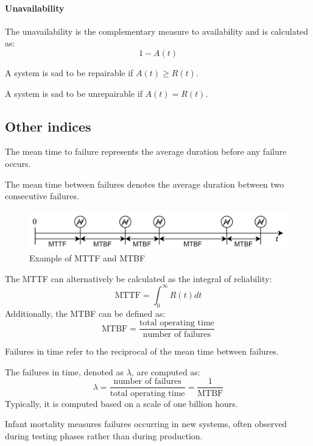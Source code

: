 \paragraph*{Unavailability}
The unavailability is the complementary measure to availability and is calculated as:
\[1-A(t)\]
\begin{definition}
    A system is sad to be repairable if $A(t) \geq R(t)$. 
\end{definition}
\begin{definition}
    A system is sad to be unrepairable if $A(t) = R(t)$. 
\end{definition}

\subsection{Other indices}
\begin{definition}
    The mean time to failure represents the average duration before any failure occurs.
\end{definition}
\begin{definition}
    The mean time between failures denotes the average duration between two consecutive failures.
\end{definition}
\begin{figure}[H]
    \centering
    \includegraphics[width=0.75\linewidth]{images/mttb.png}
    \caption{Example of MTTF and MTBF}
\end{figure}
The MTTF can alternatively be calculated as the integral of reliability:
\[\text{MTTF}=\int_0^\infty R(t)dt\]
Additionally, the MTBF can be defined as:
\[\text{MTBF}=\dfrac{\text{total operating time}}{\text{number of failures}}\]
\begin{definition}
    Failures in time refer to the reciprocal of the mean time between failures.
\end{definition}
The failures in time, denoted as $\lambda$, are computed as:
\[\lambda=\dfrac{\text{number of failures}}{\text{total operating time}}=\dfrac{1}{\text{MTBF}}\]
Typically, it is computed based on a scale of one billion hours.
\begin{definition}
    Infant mortality measures failures occurring in new systems, often observed during testing phases rather than during production.
\end{definition}
